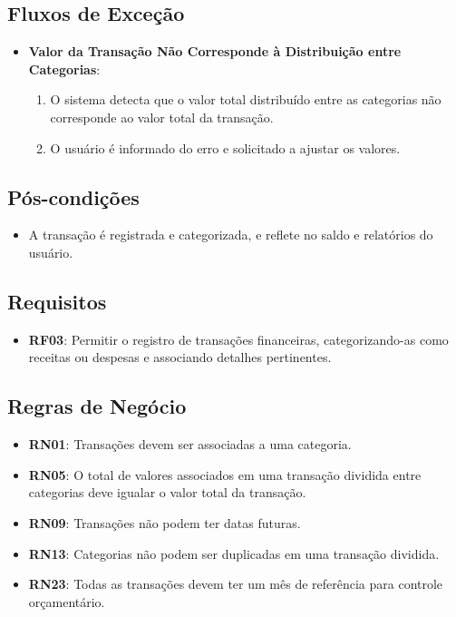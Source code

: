 \subsection*{Fluxos de Exceção}
\begin{addmargin}[1.5cm]{0cm}
	\begin{itemize}
		\item \textbf{Valor da Transação Não Corresponde à Distribuição entre Categorias}:
		      \begin{enumerate}
		      	\item O sistema detecta que o valor total distribuído entre as categorias não corresponde ao valor total da transação.
		      	\item O usuário é informado do erro e solicitado a ajustar os valores.
		      \end{enumerate}
	\end{itemize}
\end{addmargin}

\subsection*{Pós-condições}
\begin{addmargin}[1.5cm]{0cm}
	\begin{itemize}
		\item A transação é registrada e categorizada, e reflete no saldo e relatórios do usuário.
	\end{itemize}
\end{addmargin}

\subsection*{Requisitos}
\begin{addmargin}[1.5cm]{0cm}
	\begin{itemize}
		\item \textbf{RF03}: Permitir o registro de transações financeiras, categorizando-as como receitas ou despesas e associando detalhes pertinentes.
	\end{itemize}
\end{addmargin}

\subsection*{Regras de Negócio}
\begin{addmargin}[1.5cm]{0cm}
	\begin{itemize}
		\item \textbf{RN01}: Transações devem ser associadas a uma categoria.
		\item \textbf{RN05}: O total de valores associados em uma transação dividida entre categorias deve igualar o valor total da transação.
		\item \textbf{RN09}: Transações não podem ter datas futuras.
		\item \textbf{RN13}: Categorias não podem ser duplicadas em uma transação dividida.
		\item \textbf{RN23}: Todas as transações devem ter um mês de referência para controle orçamentário.
	\end{itemize}
\end{addmargin}

